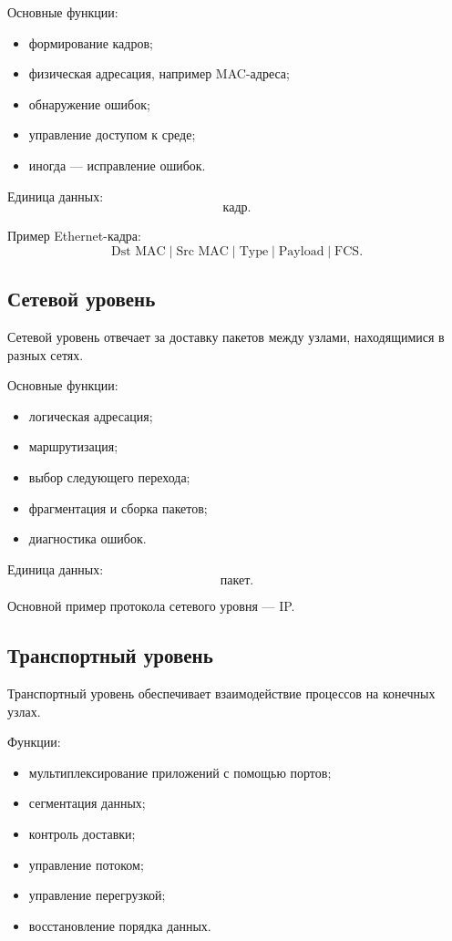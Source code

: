 \documentclass[12pt,a4paper]{article}
\begin{document}
Основные функции:
\begin{itemize}
    \item формирование кадров;
    \item физическая адресация, например MAC-адреса;
    \item обнаружение ошибок;
    \item управление доступом к среде;
    \item иногда --- исправление ошибок.
\end{itemize}

Единица данных:
\[
\text{кадр}.
\]

Пример Ethernet-кадра:
\[
\text{Dst MAC} \;|\; \text{Src MAC} \;|\; \text{Type} \;|\; \text{Payload} \;|\; \text{FCS}.
\]

\subsection{Сетевой уровень}

Сетевой уровень отвечает за доставку пакетов между узлами, находящимися в разных сетях.

Основные функции:
\begin{itemize}
    \item логическая адресация;
    \item маршрутизация;
    \item выбор следующего перехода;
    \item фрагментация и сборка пакетов;
    \item диагностика ошибок.
\end{itemize}

Единица данных:
\[
\text{пакет}.
\]

Основной пример протокола сетевого уровня --- IP.

\subsection{Транспортный уровень}

Транспортный уровень обеспечивает взаимодействие процессов на конечных узлах.

Функции:
\begin{itemize}
    \item мультиплексирование приложений с помощью портов;
    \item сегментация данных;
    \item контроль доставки;
    \item управление потоком;
    \item управление перегрузкой;
    \item восстановление порядка данных.
\end{itemize}
\end{document}

